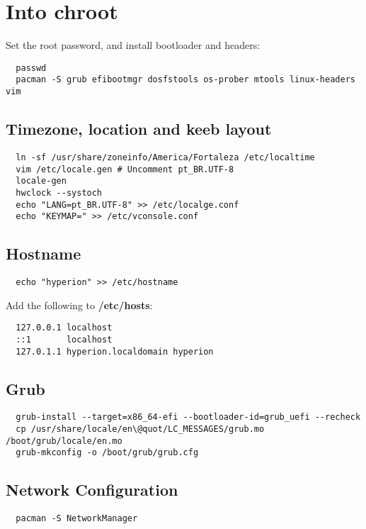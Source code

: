 \documentclass{article}
\begin{document}
\section{Into chroot}
Set the root password, and install bootloader and headers:
\begin{lstlisting}
  passwd
  pacman -S grub efibootmgr dosfstools os-prober mtools linux-headers vim
\end{lstlisting}

\subsection{Timezone, location and keeb layout}
\begin{lstlisting}
  ln -sf /usr/share/zoneinfo/America/Fortaleza /etc/localtime
  vim /etc/locale.gen # Uncomment pt_BR.UTF-8
  locale-gen
  hwclock --systoch
  echo "LANG=pt_BR.UTF-8" >> /etc/localge.conf
  echo "KEYMAP=" >> /etc/vconsole.conf
\end{lstlisting}

\subsection{Hostname}
\begin{lstlisting}
  echo "hyperion" >> /etc/hostname
\end{lstlisting}

Add the following to \textbf{/etc/hosts}:
\begin{lstlisting}
  127.0.0.1 localhost
  ::1       localhost
  127.0.1.1 hyperion.localdomain hyperion
\end{lstlisting}

\subsection{Grub}
\begin{lstlisting}
  grub-install --target=x86_64-efi --bootloader-id=grub_uefi --recheck
  cp /usr/share/locale/en\@quot/LC_MESSAGES/grub.mo /boot/grub/locale/en.mo
  grub-mkconfig -o /boot/grub/grub.cfg
\end{lstlisting}

\subsection{Network Configuration}
\begin{lstlisting}
  pacman -S NetworkManager
\end{lstlisting}
\end{document}

